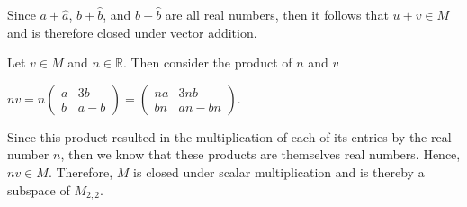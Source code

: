 \documentclass[12pt, a4paper]{article}
\begin{document}
\begin{enumerate}
    \vspace{4mm}
    
    Since $a+\hat{a}$, $b+\hat{b}$, and $b+\hat{b}$ are all real numbers, then it follows that $u+v\in M$ and is therefore closed under vector addition.\par
    \hspace{4mm}Let $v\in M$ and $n\in\mathbb{R}$. Then consider the product of $n$ and $v$\par
    
    \vspace{4mm}
    
    \centerline{$nv=n\left( \begin{array}{cc} a & 3b\\ b & a-b\end{array}\right)=\left( \begin{array}{cc} na & 3nb\\ bn & an-bn\end{array}\right)$.}
    
    \vspace{4mm}
    
    Since this product resulted in the multiplication of each of its entries by the real number $n$, then we know that these products are themselves real numbers. Hence, $nv\in M$. Therefore, $M$ is closed under scalar multiplication and is thereby a subspace of $M_{2,2}$.
    
    
\end{enumerate}
\end{document}
